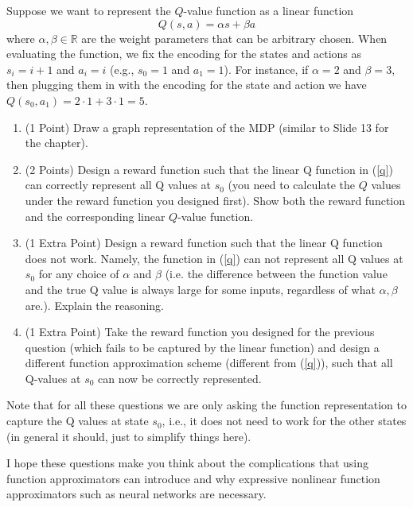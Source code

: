 \documentclass{article}
\begin{document}
\begin{question}
Suppose we want to represent the $Q$-value function as a linear function
\begin{equation}\label{q}
Q(s,a)=\alpha s + \beta a
\end{equation}
where $\alpha,\beta\in \mathbb{R}$ are the weight parameters that can be arbitrary chosen. When evaluating the function, we fix the encoding for the states and actions as $s_i=i+1$ and $a_i=i$ (e.g., $s_0=1$ and $a_1=1$). For instance, if $\alpha=2$ and $\beta=3$, then plugging them in with the encoding for the state and action we have $Q(s_0,a_1)=2\cdot 1+3\cdot 1=5$. 
\begin{enumerate}
    \item (1 Point) Draw a graph representation of the MDP (similar to Slide 13 for the chapter). 
    \item (2 Points) Design a reward function such that the linear Q function in (\ref{q}) can correctly represent all Q values at $s_0$ (you need to calculate the $Q$ values under the reward function you designed first). Show both the reward function and the corresponding linear $Q$-value function. 
    \item (1 Extra Point) Design a reward function such that the linear Q function does not work. Namely, the function in (\ref{q}) can not represent all Q values at $s_0$ for any choice of $\alpha$ and $\beta$ (i.e. the difference between the function value and the true Q value is always large for some inputs, regardless of what $\alpha,\beta$ are.). Explain the reasoning. 
    \item (1 Extra Point) Take the reward function you designed for the previous question (which fails to be captured by the linear function) and design a different function approximation scheme (different from (\ref{q})), such that all Q-values at $s_0$ can now be correctly represented. 
\end{enumerate}
Note that for all these questions we are only asking the function representation to capture the Q values at state $s_0$, i.e., it does not need to work for the other states (in general it should, just to simplify things here). 

I hope these questions make you think about the complications that using function approximators can introduce and why expressive nonlinear function approximators such as neural networks are necessary. 
\end{question}
\end{document}
